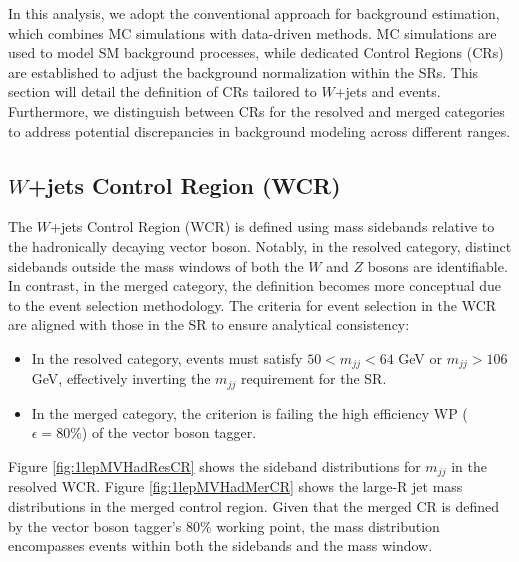 \label{subsec:cr_selection}

In this analysis, we adopt the conventional approach for background estimation, which combines MC simulations with data-driven methods. MC simulations are used to model SM background processes, while dedicated Control Regions (CRs) are established to adjust the background normalization within the SRs.
This section will detail the definition of CRs tailored to $W$+jets and \ttbar events. Furthermore, we distinguish between CRs for the resolved and merged categories to address potential discrepancies in background modeling across different \pt ranges.

\subsection{$W$+jets Control Region (WCR)}
\label{wcr_definition}

The $W$+jets Control Region (WCR) is defined using mass sidebands relative to the hadronically decaying vector boson. Notably, in the resolved category, distinct sidebands outside the mass windows of both the $W$ and $Z$ bosons are identifiable.
In contrast, in the merged category, the definition becomes more conceptual due to the event selection methodology. The criteria for event selection in the WCR are aligned with those in the SR to ensure analytical consistency:
 
\begin{itemize}
    \item In the resolved category, events must satisfy $50 < m_{jj} < 64$ GeV or $m_{jj} > 106$ GeV, effectively inverting the $m_{jj}$ requirement for the SR.
    \item In the merged category, the criterion is failing the high efficiency WP ($\epsilon=80\%$) of the vector boson tagger.
\end{itemize}

Figure \ref{fig:1lepMVHadResCR} shows the sideband distributions for $m_{jj}$ in the resolved WCR.
Figure \ref{fig:1lepMVHadMerCR} shows the large-R jet mass distributions in the merged control region. Given that the merged CR is defined by the vector boson tagger's $80\%$ working point, the mass distribution encompasses events within both the sidebands and the mass window.

